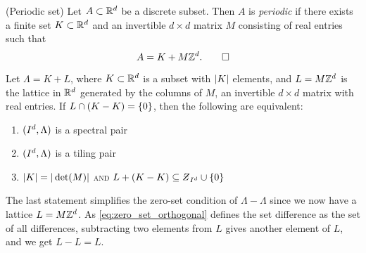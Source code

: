 \documentclass[../thesis.tex]{subfiles}
\begin{document}
\begin{definition}(Periodic set)\label{def:periodic_set}
    Let $A\subset\mathbb{R}^d$ be a discrete subset. Then $A$ is \emph{periodic} if there exists a finite set $K\subset\mathbb{R}^d$ and an invertible $d\times d$ matrix $M$ consisting of real entries such that 
    \begin{equation*}
        A = K + M\mathbb{Z}^d. \qedhere
    \end{equation*}
\end{definition}

\begin{theorem}\label{thrm:periodic_equivalence}
    Let $\Lambda= K + L$, where $K\subset \mathbb{R}^d$ is a subset with $|K|$ elements, and $L=M\mathbb{Z}^d$ is the lattice in $\mathbb{R}^d$ generated by the columns of $M$, an invertible $d\times d$ matrix with real entries. If $L\cap(K-K)= \{0\}$, then the following are equivalent:
    \begin{enumerate}[label=(\roman*), topsep=-3pt]
        \item $(I^d,\Lambda)$ is a spectral pair
        \item $(I^d,\Lambda)$ is a tiling pair
        \item $|K| = |\det(M)|$ \textsc{and} $L+\brac{K-K}\subseteq \Zstroke_{I^d} \cup \braq{0}$
    \end{enumerate}
\end{theorem}

\begin{remark}
    The last statement simplifies the zero-set condition of $\Lambda-\Lambda$ since we now have a lattice $L=M\mathbb{Z}^d$. As \cref{eq:zero_set_orthogonal}  defines the set difference as the set of all differences, subtracting two elements from $L$ gives another element of $L$, and we get $L-L=L$.
\end{remark}
\end{document}
